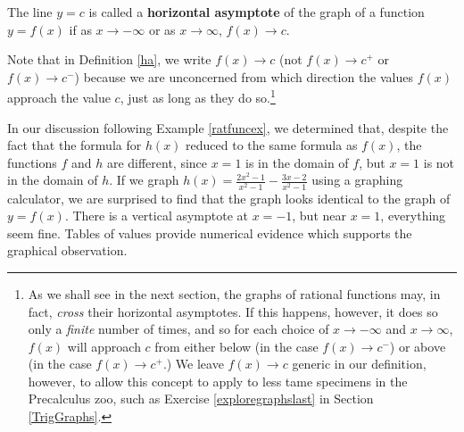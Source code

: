 \medskip

\colorbox{ResultColor}{\bbm

\begin{defn} \label{ha} The line $y=c$ is called a \textbf{horizontal asymptote} of the graph of a function $y=f(x)$ if as $x \rightarrow -\infty$ or as $x \rightarrow \infty$, $f(x) \rightarrow c$.


\end{defn}
\ebm}

\medskip

Note that in Definition \ref{ha}, we write $f(x) \rightarrow c$ (not $f(x) \rightarrow c^{+}$ or $f(x) \rightarrow c^{-}$) because we are unconcerned from which direction the values $f(x)$ approach the value $c$, just as long as they do so.\footnote{As we shall see in the next section, the graphs of rational functions may, in fact, \textit{cross} their horizontal asymptotes.  If this happens, however,  it does so only a \textit{finite} number of times, and so for each choice of $x \rightarrow -\infty$ and $x \rightarrow \infty$, $f(x)$ will approach $c$ from either below (in the case $f(x) \rightarrow c^{-}$) or above (in the case $f(x) \rightarrow c^{+}$.)  We leave $f(x) \rightarrow c$ generic in our definition, however, to allow this concept to apply to less tame specimens in the Precalculus zoo, such as Exercise \ref{exploregraphslast} in Section \ref{TrigGraphs}.}

In our discussion following Example \ref{ratfuncex}, we determined that, despite the fact that the formula for $h(x)$ reduced to the same formula as $f(x)$, the functions $f$ and $h$ are different, since $x=1$ is in the domain of $f$, but $x=1$ is not in the domain of $h$.  If we graph $h(x)=\frac{2x^2-1}{x^2-1} - \frac{3x-2}{x^2-1}$ using a graphing calculator, we are surprised to find that the graph looks identical to the graph of $y=f(x)$.   There is a vertical asymptote at $x=-1$, but near $x=1$, everything seem fine.  Tables of values provide numerical evidence which supports the graphical observation.

